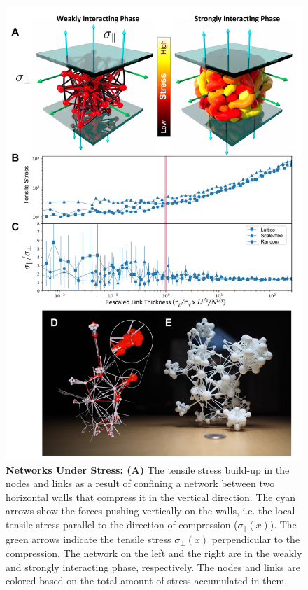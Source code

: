 \documentclass[endfloats,nofootinbib,preprint,floatfix,titlepage,superscriptaddress,linenumbers]{revtex4-1} %
\begin{document}
\begin{figure}
    \centering
    
    \vspace{5cm}
    \includegraphics[width=.7\columnwidth, trim=0 1cm 0 5cm]{fig-09-19/3D-stress-pics-042418.pdf}
    \caption{\scriptsize
    {\bf Networks Under Stress: (A)} The tensile stress build-up in the nodes and links as a result of confining a network between two horizontal walls that
    compress it in the vertical direction.
    The cyan arrows show the forces pushing vertically on the walls, i.e. the local tensile stress parallel to the direction of compression ($\sigma_\parallel(x)$). 
    The green arrows indicate the tensile stress $\sigma_\perp(x)$
    perpendicular to the compression. 
    The network on the left and the right are in the weakly and strongly interacting phase, respectively. 
    The nodes and links are colored based on the total amount of stress accumulated in them. 
}
\end{figure}
\end{document}
